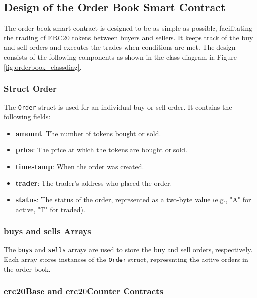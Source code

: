 \subsection{Design of the Order Book Smart Contract}


The order book smart contract is designed to be as simple as possible, facilitating the trading of ERC20 tokens between buyers and sellers. It
keeps track of the buy and sell orders and executes the trades when conditions are met. The design consists of the following components
as shown in the class diagram in Figure \ref{fig:orderbook_classdiag}.








\subsubsection{Struct Order}


The \texttt{Order} struct is used for an individual buy or sell order. It contains the following fields:
\begin{itemize}
   \item \textbf{amount}: The number of tokens bought or sold.
   \item \textbf{price}: The price at which the tokens are bought or sold.
   \item \textbf{timestamp}: When the order was created.
   \item \textbf{trader}: The trader's address who placed the order.
   \item \textbf{status}: The status of the order, represented as a two-byte value (e.g., "A" for active, "T" for traded).
\end{itemize}


\subsubsection{buys and sells Arrays}


The \texttt{buys} and \texttt{sells} arrays are used to store the buy and sell orders, respectively. Each array stores instances
of the \texttt{Order} struct, representing the active orders in the order book.


\subsubsection{erc20Base and erc20Counter Contracts}


